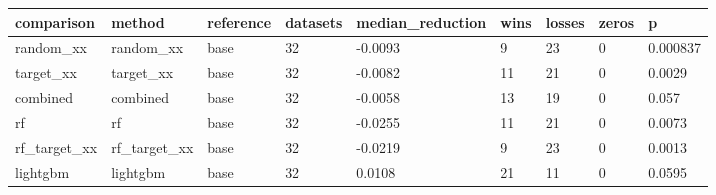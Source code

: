 \begin{tabular}{lllllllll}
\toprule
comparison & method & reference & datasets & median\_reduction & wins & losses & zeros & p \\
\midrule
random\_xx & random\_xx & base & 32 & -0.0093 & 9 & 23 & 0 & 0.000837 \\
target\_xx & target\_xx & base & 32 & -0.0082 & 11 & 21 & 0 & 0.0029 \\
combined & combined & base & 32 & -0.0058 & 13 & 19 & 0 & 0.057 \\
rf & rf & base & 32 & -0.0255 & 11 & 21 & 0 & 0.0073 \\
rf\_target\_xx & rf\_target\_xx & base & 32 & -0.0219 & 9 & 23 & 0 & 0.0013 \\
lightgbm & lightgbm & base & 32 & 0.0108 & 21 & 11 & 0 & 0.0595 \\
\bottomrule
\end{tabular}
